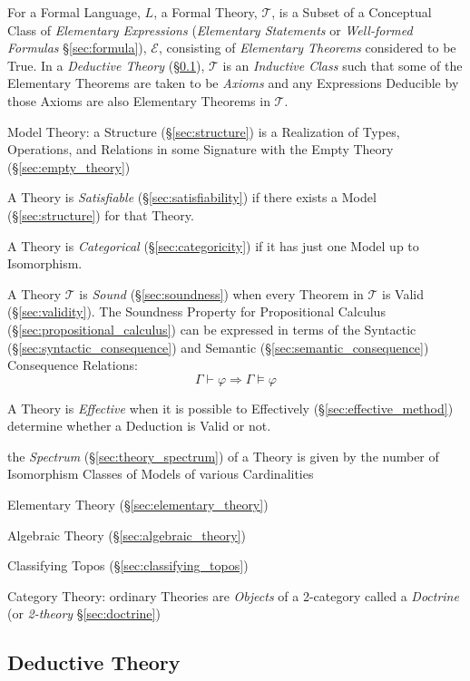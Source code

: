 For a Formal Language, $L$, a Formal Theory, $\mathcal{T}$, is a
Subset of a Conceptual Class of \emph{Elementary Expressions}
(\emph{Elementary Statements} or \emph{Well-formed Formulas}
\S\ref{sec:formula}), $\mathcal{E}$, consisting of \emph{Elementary
  Theorems} considered to be True. In a \emph{Deductive Theory}
(\S\ref{sec:deductive_theory}), $\mathcal{T}$ is an \emph{Inductive
  Class} such that some of the Elementary Theorems are taken to be
\emph{Axioms} and any Expressions Deducible by those Axioms are also
Elementary Theorems in $\mathcal{T}$.

Model Theory: a Structure (\S\ref{sec:structure}) is a Realization of
Types, Operations, and Relations in some Signature with the Empty
Theory (\S\ref{sec:empty_theory})

A Theory is \emph{Satisfiable} (\S\ref{sec:satisfiability}) if there
exists a Model (\S\ref{sec:structure}) for that Theory.

A Theory is \emph{Categorical} (\S\ref{sec:categoricity}) if it has
just one Model up to Isomorphism.

A Theory $\mathcal{T}$ is \emph{Sound} (\S\ref{sec:soundness}) when
every Theorem in $\mathcal{T}$ is Valid (\S\ref{sec:validity}). The
Soundness Property for Propositional Calculus
(\S\ref{sec:propositional_calculus}) can be expressed in terms of the
Syntactic (\S\ref{sec:syntactic_consequence}) and Semantic
(\S\ref{sec:semantic_consequence}) Consequence Relations:
\[
  \Gamma \vdash \varphi \Rightarrow \Gamma \vDash \varphi
\]

A Theory is \emph{Effective} when it is possible to Effectively
(\S\ref{sec:effective_method}) determine whether a Deduction is Valid
or not.

the \emph{Spectrum} (\S\ref{sec:theory_spectrum}) of a Theory is given by the
number of Isomorphism Classes of Models of various Cardinalities

Elementary Theory (\S\ref{sec:elementary_theory})

Algebraic Theory (\S\ref{sec:algebraic_theory})

Classifying Topos (\S\ref{sec:classifying_topos})

Category Theory: ordinary Theories are \emph{Objects} of a 2-category
called a \emph{Doctrine} (or \emph{2-theory} \S\ref{sec:doctrine})



\subsection{Deductive Theory}\label{sec:deductive_theory}

